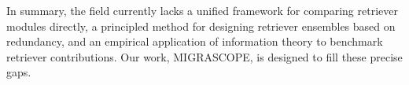 \documentclass{article}
\theoremstyle{plain}
\theoremstyle{definition}
\theoremstyle{remark}
\begin{document}
In summary, the field currently lacks a unified framework for comparing retriever modules directly, a principled method for designing retriever ensembles based on redundancy, and an empirical application of information theory to benchmark retriever contributions. Our work, MIGRASCOPE, is designed to fill these precise gaps.









\end{document}
